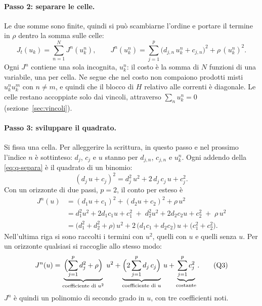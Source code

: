 \documentclass[11pt,a4paper]{article}
\begin{document}
\paragraph{Passo 2: separare le celle.} Le due somme sono finite, quindi si
può scambiarne l'ordine e portare il termine in $\rho$ dentro la somma sulle
celle:
\begin{equation}
  J_t(u_k) = \sum_{n=1}^{N} J^n(u^n_k) ,
  \qquad
  J^n(u^n_k) = \sum_{j=1}^{p} \bigl(d_{j,n}\,u^n_k + c_{j,n}\bigr)^2 + \rho\,(u^n_k)^2 .
  \tag{Q2}\label{eq:q-separa}
\end{equation}
Ogni $J^n$ contiene una sola incognita, $u^n_k$: il costo è la somma di $N$
funzioni di una variabile, una per cella. Ne segue che nel costo non
compaiono prodotti misti $u^n_k u^m_k$ con $n \ne m$, e quindi che il blocco di
$H$ relativo alle correnti è diagonale. Le celle restano accoppiate solo dai
vincoli, attraverso $\sum_n u^n_k = 0$ (sezione~\ref{sec:vincoli}).

\paragraph{Passo 3: sviluppare il quadrato.} Si fissa una cella. Per
alleggerire la scrittura, in questo passo e nel prossimo l'indice $n$ è
sottinteso: $d_j$, $c_j$ e $u$ stanno per $d_{j,n}$, $c_{j,n}$ e $u^n_k$. Ogni
addendo della \eqref{eq:q-separa} è il quadrato di un binomio:
\[
  (d_j\,u + c_j)^2 = d_j^2\,u^2 + 2\,d_j\,c_j\,u + c_j^2 .
\]
Con un orizzonte di due passi, $p = 2$, il conto per esteso è
\begin{align*}
  J^n(u) &= (d_1 u + c_1)^2 + (d_2 u + c_2)^2 + \rho\,u^2 \\
         &= d_1^2 u^2 + 2 d_1 c_1 u + c_1^2
            \;+\; d_2^2 u^2 + 2 d_2 c_2 u + c_2^2
            \;+\; \rho\,u^2 \\
         &= \bigl(d_1^2 + d_2^2 + \rho\bigr)\, u^2
            + 2\,\bigl(d_1 c_1 + d_2 c_2\bigr)\, u
            + \bigl(c_1^2 + c_2^2\bigr) .
\end{align*}
Nell'ultima riga si sono raccolti i termini con $u^2$, quelli con $u$ e
quelli senza $u$. Per un orizzonte qualsiasi si raccoglie allo stesso modo:
\begin{equation}
  J^n(u) = \underbrace{\Bigl(\sum_{j=1}^{p} d_j^2 + \rho\Bigr)}_{\text{coefficiente di } u^2}\, u^2
         + \underbrace{\Bigl(2\sum_{j=1}^{p} d_j\,c_j\Bigr)}_{\text{coefficiente di } u}\, u
         + \underbrace{\sum_{j=1}^{p} c_j^2}_{\text{costante}} .
  \tag{Q3}\label{eq:q-sviluppo}
\end{equation}
$J^n$ è quindi un polinomio di secondo grado in $u$, con tre coefficienti
noti.
\end{document}
